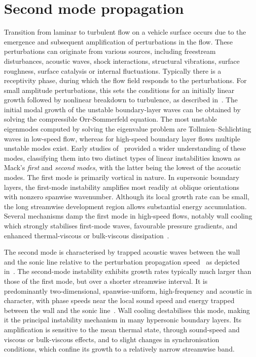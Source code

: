 \section{Second mode propagation}

Transition from laminar to turbulent flow on a vehicle surface occurs due to the emergence and subsequent amplification of perturbations in the flow. These perturbations can originate from various sources, including freestream disturbances, acoustic waves, shock interactions, structural vibrations, surface roughness, surface catalysis or internal fluctuations. Typically there is a receptivity phase, during which the flow field responds to the perturbations. For small amplitude perturbations, this sets the conditions for an initially linear growth followed by nonlinear breakdown to turbulence, as described in~\cite{reshotko2008}. The initial modal growth of the unstable boundary-layer waves can be obtained by solving the compressible Orr-Sommerfeld equation. The most unstable eigenmodes computed by solving the eigenvalue problem are Tollmien--Schlichting waves in low-speed flow, whereas for high-speed boundary layer flows multiple unstable modes exist. Early studies of~\cite{Mack1969} provided a wider understanding of these modes, classifying them into two distinct types of linear instabilities known as Mack's \textit{first} and \textit{second modes}, with the latter being the lowest of the acoustic modes. The first mode is primarily vortical in nature. In supersonic boundary layers, the first-mode instability amplifies most readily at oblique orientations with nonzero spanwise wavenumber. Although its local growth rate can be small, the long streamwise development region allows substantial energy accumulation. Several mechanisms damp the first mode in high-speed flows, notably wall cooling which strongly stabilises first-mode waves, favourable pressure gradients, and enhanced thermal-viscous or bulk-viscous dissipation~\citep{Mack1984}.

The second mode is characterised by trapped acoustic waves between the wall and the sonic line relative to the perturbation propagation speed~\citep{Fedorov2001} as depicted in~. The second-mode instability exhibits growth rates typically much larger than those of the first mode, but over a shorter streamwise interval. It is predominantly two-dimensional, spanwise-uniform, high-frequency and acoustic in character, with phase speeds near the local sound speed and energy trapped between the wall and the sonic line~\citep{DeTullio2013}. Wall cooling destabilises this mode, making it the principal instability mechanism in many hypersonic boundary layers. Its amplification is sensitive to the mean thermal state, through sound-speed and viscous or bulk-viscous effects, and to slight changes in synchronisation conditions, which confine its growth to a relatively narrow streamwise band.




